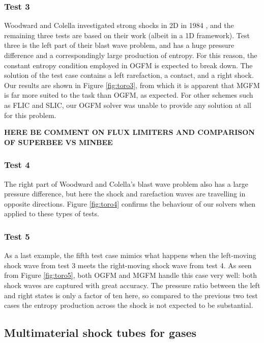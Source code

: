 \documentclass[final,3p,twocolumn]{elsarticle}
\begin{document}
\subsubsection{Test 3}

Woodward and Colella investigated strong shocks in 2D in 1984
\cite{woodward1984numerical}, and the remaining three tests are based on their
work (albeit in a 1D framework). Test three is the left part of their blast
wave problem, and has a huge pressure difference and a correspondingly large
production of entropy. For this reason, the constant entropy condition employed
in OGFM is expected to break down. The solution of the test case contains a
left rarefaction, a contact, and a right shock. Our results are shown in
Figure \ref{fig:toro3}, from which it is apparent that MGFM is far more suited
to the task than OGFM, as expected. For other schemes such as FLIC and SLIC,
our OGFM solver was unable to provide any solution at all for this problem. 

{\bf \huge HERE BE COMMENT ON FLUX LIMITERS AND COMPARISON OF SUPERBEE VS
MINBEE}

\subsubsection{Test 4}

The right part of Woodward and Colella's blast wave problem also has a large
pressure difference, but here the shock and rarefaction waves are travelling in
opposite directions. Figure \ref{fig:toro4} confirms the behaviour of our
solvers when applied to these types of tests. 

\subsubsection{Test 5}

As a last example, the fifth test case mimics what happens when the left-moving
shock wave from test 3 meets the right-moving shock wave from test 4. As seen
from Figure \ref{fig:toro5}, both OGFM and MGFM handle this case very well:
both shock waves are captured with great accuracy. The pressure ratio between
the left and right states is only a factor of ten here, so compared to the
previous two test cases the entropy production across the shock is not expected
to be substantial. 

\subsection{Multimaterial shock tubes for gases}
\label{subsec:shocktubes}
\end{document}
